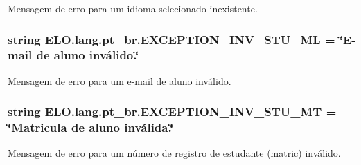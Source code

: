 Mensagem de erro para um idioma selecionado inexistente. 

\hypertarget{namespaceELO_1_1lang_1_1pt__br_ae55ddb893ecbbca5f9599c263077f8c9}{
\subsubsection[{E\-X\-C\-E\-P\-T\-I\-O\-N\-\_\-\-I\-N\-V\-\_\-\-S\-T\-U\-\_\-\-M\-L}]{\setlength{\rightskip}{0pt plus 5cm}string E\-L\-O.\-lang.\-pt\-\_\-br.\-E\-X\-C\-E\-P\-T\-I\-O\-N\-\_\-\-I\-N\-V\-\_\-\-S\-T\-U\-\_\-\-M\-L = \char`\"{}E-\/mail de aluno inválido.\char`\"{}}}\label{d5/d70/namespaceELO_1_1lang_1_1pt__br_ae55ddb893ecbbca5f9599c263077f8c9}


Mensagem de erro para um e-\/mail de aluno inválido. 

\hypertarget{namespaceELO_1_1lang_1_1pt__br_ad7e77e402e9c4b2f6c69b19f1609a0d5}{
\subsubsection[{E\-X\-C\-E\-P\-T\-I\-O\-N\-\_\-\-I\-N\-V\-\_\-\-S\-T\-U\-\_\-\-M\-T}]{\setlength{\rightskip}{0pt plus 5cm}string E\-L\-O.\-lang.\-pt\-\_\-br.\-E\-X\-C\-E\-P\-T\-I\-O\-N\-\_\-\-I\-N\-V\-\_\-\-S\-T\-U\-\_\-\-M\-T = \char`\"{}Matricula de aluno inválida.\char`\"{}}}\label{d5/d70/namespaceELO_1_1lang_1_1pt__br_ad7e77e402e9c4b2f6c69b19f1609a0d5}


Mensagem de erro para um número de registro de estudante (matric) inválido. 


